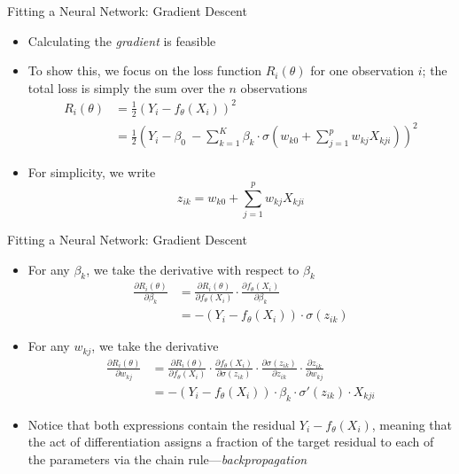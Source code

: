 \documentclass[aspectratio=1610,12pt,xcolor=dvipsnames]{beamer}
\begin{document}
\begin{frame}{Fitting a Neural Network: Gradient Descent}

\begin{itemize}
    \item Calculating the \textit{gradient} is feasible
    \item To show this, we focus on the loss function $R_i(\theta)$ for one observation $i$; the total loss is simply the sum over the $n$ observations
    \begin{align*}
        R_i(\theta) &= \frac{1}{2} \left( Y_i - f_{\theta} (X_i) \right)^2 \\
        &= \frac{1}{2} \left( Y_i - \beta_0 \ - \sum_{k=1}^{K} \beta_k  \cdot\sigma\left(w_{k0} + \sum_{j=1}^{p} w_{kj}X_{kji} \right) \right)^2
    \end{align*}
    \item For simplicity, we write $$z_{ik} = w_{k0} + \sum_{j=1}^{p} w_{kj}X_{kji}$$
\end{itemize}
\end{frame}

\begin{frame}{Fitting a Neural Network: Gradient Descent}

\begin{itemize}
    \item For any $\beta_k$, we take the derivative with respect to $\beta_k$
    \begin{align*}
        \frac{\partial R_i(\theta)}{\partial \beta_k} &= \frac{\partial R_i(\theta)}{\partial f_{\theta}(X_i)} \cdot \frac{\partial f_{\theta}(X_i)}{\partial \beta_k} \\
        &=-(Y_i - f_{\theta}(X_i)) \cdot \sigma(z_{ik})
    \end{align*}
    \item For any $w_{kj}$, we take the derivative
    \begin{align*}
        \frac{\partial R_i(\theta)}{\partial w_{kj}} &= \frac{\partial R_i(\theta)}{\partial f_{\theta}(X_i)} \cdot \frac{\partial f_{\theta}(X_i)}{\partial \sigma(z_{ik})}  \cdot \frac{\partial \sigma(z_{ik})}{\partial z_{ik}}  \cdot \frac{\partial z_{ik}}{\partial w_{kj}} \\
        &= -(Y_i - f_{\theta}(X_i)) \cdot \beta_k \cdot \sigma'(z_{ik}) \cdot X_{kji}
    \end{align*}
    \item Notice that both expressions contain the residual $Y_i - f_{\theta}(X_i)$, meaning that the act of differentiation assigns a fraction of the target residual to each of the parameters via the chain rule—\textit{backpropagation}
\end{itemize}
\end{frame}
\end{document}
